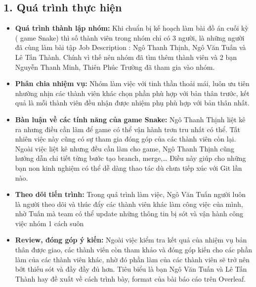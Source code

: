 \documentclass[12pt]{report}
\begin{document}
\subsection*{1. Quá trình thực hiện}
\begin{itemize}
    \item \textbf{Quá trình thành lập nhóm:} Khi chuẩn bị kế hoạch làm bài đồ án cuối kỳ ( game Snake) thì số thành viên trong nhóm chỉ có 3 người, là những người đã cùng làm bài tập Job Description : Ngô Thanh Thịnh, Ngô Văn Tuấn và Lê Tấn Thành. Chính vì thế nên nhóm đã tìm thêm thành viên và 2 bạn Nguyễn Thanh Minh, Thiên Phúc Trường đã tham gia vào nhóm. 
     \item \textbf{Phân chia nhiệm vụ:} Nhóm làm việc với tinh thần thoải mái, luôn ưu tiên nhường nhịn các thành viên khác chọn phần phù hợp với bản thân trước, kết quả là mỗi thành viên đều nhận được nhiệm phụ phù hợp với bản thân nhất.
      \item \textbf{Bàn luận về các tính năng của game Snake:} Ngô Thanh Thịnh liệt kê ra nhưng điều cần làm để game có thể vận hành trơn tru nhất có thể. Tất nhiên việc này cũng có sự tham gia đóng góp của các thành viên còn lại. Ngoài việc liệt kê nhưng đều cần làm cho game, Ngô Thanh Thịnh cũng hướng dẫn chi tiết từng bước tạo branch, merge,… Điều này giúp cho những bạn non kinh nghiệm có thể dễ dàng thao tác dù chưa tiếp xúc với Git lần nào.
       \item \textbf{Theo dõi tiến trình:} Trong quá trình làm việc, Ngô Văn Tuấn người luôn là người theo dõi và thúc đẩy các thành viên khác làm công việc của mình, nhờ Tuấn mà team có thể update những thông tin bị sót và vận hành công việc nhóm 1 cách suôn
       \item \textbf{Review, đóng góp ý kiến:} Ngoài việc kiểm tra kết quả của nhiệm vụ bản thân được giao, các thành viên còn tham khảo và đóng góp kiến cho các phần làm của các thành viên khác, nhờ đó phần làm của các thành viên sẽ trở nên bớt thiếu sót và đầy đầy đủ hơn. Tiêu biểu là bạn Ngô Văn Tuấn và Lê Tấn Thành hay đề xuất về cách trình bày, format của bài báo cáo trên Overleaf.

       \end{itemize}

       
\end{document}
